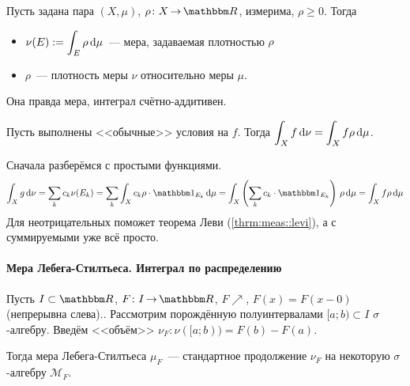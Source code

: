 \documentclass[draft, timbord]{longnotes}
\begin{document}
\begin{defn}\label{defn:meas::discint::dens}
  Пусть задана пара  
  $(X, \mu)$, $\rho \colon X \to \R$, измерима, $\rho \geqslant 0$. 
  Тогда 
  \begin{itemize}
    \item $\displaystyle \nu(E) := \int_E \rho \, \mathrm{d} \mu $~--- мера, задаваемая плотностью
      $\rho$
    \item $\rho$~--- плотность меры $\nu$ относительно меры $\mu$.
  \end{itemize}
\end{defn}

\begin{rem*}
  Она правда мера, интеграл счётно-аддитивен.
\end{rem*}

\begin{thrm}\label{thrm:meas::discint::intchg}
  Пусть выполнены <<обычные>> условия на $f$. Тогда 
  $\displaystyle \int_X f \, \mathrm{d} \nu = \int_X f \rho \, \mathrm{d} \mu$.
\end{thrm}
\begin{tproof}
  Сначала разберёмся с простыми функциями. \[
    \int_X g \, \del \nu =  \sum_k c_k \nu (E_k)
    = \sum_k \int_X c_k \rho \cdot \ind_{E_k}\, \del \mu
    = \int_X \left(\sum_k c_k \cdot \ind_{E_k}\right)\, \rho \, \del \mu
    = \int_X f \rho \, \del \mu 
  \]
  Для неотрицательных поможет теорема Леви (\ref{thrm:meas::levi}), 
  а с суммируемыми уже всё просто.
\end{tproof}

\paragraph{Мера Лебега-Стилтьеса. Интеграл по распределению}
\label{par:meas::lebstil}

\begin{defn}\label{defn:meas::lebstil::meas}
  Пусть $I \subset \R$, $F \colon I \to \R$, $F \nearrow$, $F(x) = F(x-0)$ 
  (непрерывна слева).\note{А можно и без. Тогда $\nu([a;b)) = F(b-0) - F(a-0)$,
  см.~\ref{makpodk}}.
  Рассмотрим порождённую полуинтервалами $[a;b) \subset I$ $\sigma$-алгебру.
  Введём <<объём>> $\nu_F \colon \nu([a;b)) = F(b) - F(a)$.
  
  Тогда мера Лебега-Стилтьеса $\mu_F$~--- стандартное продолжение $\nu_F$ на некоторую
  $\sigma$-алгебру $\mathcal M_F$.
\end{defn}
\end{document}
